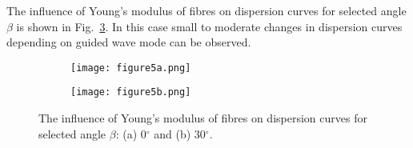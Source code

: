 \documentclass[preprint,12pt]{elsarticle}
\providecommand{\DIFaddbeginFL}{} %
\providecommand{\DIFaddendFL}{} %
\providecommand{\DIFdelbeginFL}{} %
\providecommand{\DIFdelendFL}{} %
\begin{document}
The influence of Young's modulus of fibres on dispersion curves for selected angle $\beta$ is shown in Fig.~\ref{fig:ef}. In this case small to moderate changes in dispersion curves depending on guided wave mode can be observed. 

\begin{figure} [h!]
	\centering
	\begin{subfigure}[b]{0.49\textwidth}
		\centering
		\DIFdelbeginFL %
\DIFdelendFL \DIFaddbeginFL \texttt{[image: figure5a.png]}
		\DIFaddendFL \caption{}
		\label{fig:ef0}
	\end{subfigure}
	\hfill
	\begin{subfigure}[b]{0.49\textwidth}
		\centering
		\DIFdelbeginFL %
\DIFdelendFL \DIFaddbeginFL \texttt{[image: figure5b.png]}
		\DIFaddendFL \caption{}
		\label{fig:ef30}
	\end{subfigure}
		\caption{The influence of Young's modulus of fibres on dispersion curves for selected angle $\beta$: (a) 0$^{\circ}$ and (b) 30$^{\circ}$.} 
	\label{fig:ef}
\end{figure}
\end{document}
